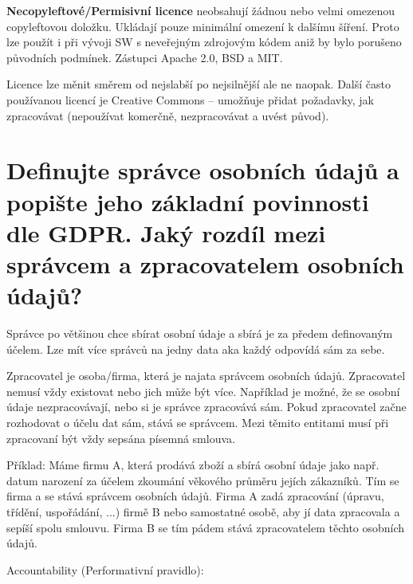 \documentclass{article}
\begin{document}
\textbf{Necopyleftové/Permisivní licence} neobsahují žádnou nebo velmi omezenou copyleftovou doložku.
Ukládají pouze minimální omezení k dalšímu šíření. Proto lze použít i při vývoji SW s neveřejným zdrojovým kódem aniž by bylo porušeno původních podmínek. Zástupci Apache 2.0, BSD a MIT.

Licence lze měnit směrem od nejslabší po nejsilnější ale ne naopak. Další často používanou
licencí je Creative Commons -- umožňuje přidat požadavky, jak zpracovávat (nepoužívat komerčně, nezpracovávat a uvést původ).

\section{Definujte správce osobních údajů a popište jeho základní povinnosti dle GDPR. Jaký rozdíl mezi správcem a zpracovatelem osobních údajů?}
Správce po většinou chce sbírat osobní údaje a sbírá je za předem definovaným účelem.
Lze mít více správců na jedny data aka každý odpovídá sám za sebe.

Zpracovatel je osoba/firma, která je najata správcem osobních údajů. Zpracovatel nemusí vždy existovat nebo jich může být více. Například je možné, že se osobní údaje
nezpracovávají, nebo si je správce zpracovává sám. Pokud zpracovatel začne rozhodovat
o účelu dat sám, stává se správcem. Mezi těmito entitami musí při zpracovaní být vždy
sepsána písemná smlouva.

Příklad: Máme firmu A, která prodává zboží a sbírá osobní údaje jako např. datum narození za účelem zkoumání věkového průměru jejích zákazníků. Tím
se firma a se stává správcem osobních údajů. Firma A zadá zpracování (úpravu, třídění, uspořádání, ...) firmě B nebo samostatné osobě, aby jí data zpracovala a sepíší spolu smlouvu. Firma B se tím pádem stává zpracovatelem těchto osobních údajů.

Accountability (Performativní pravidlo):
\end{document}
